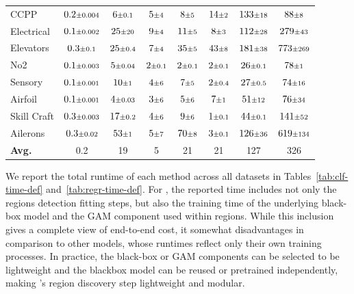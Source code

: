 \begin{table}[t]
\begin{tabular}{lccccccc}
CCPP & $0.2 \text{\scriptsize$\pm$0.004}$ & $6 \text{\scriptsize$\pm$0.1}$ & $5 \text{\scriptsize$\pm$4}$ & $8 \text{\scriptsize$\pm$5}$ & $14 \text{\scriptsize$\pm$2}$ & $133 \text{\scriptsize$\pm$18}$ & $88 \text{\scriptsize$\pm$8}$ \\
Electrical & $0.1 \text{\scriptsize$\pm$0.002}$ & $25 \text{\scriptsize$\pm$20}$ & $9 \text{\scriptsize$\pm$4}$ & $11 \text{\scriptsize$\pm$5}$ & $8 \text{\scriptsize$\pm$3}$ & $112 \text{\scriptsize$\pm$28}$ & $279 \text{\scriptsize$\pm$43}$ \\
Elevators & $0.3 \text{\scriptsize$\pm$0.1}$ & $25 \text{\scriptsize$\pm$0.4}$ & $7 \text{\scriptsize$\pm$4}$ & $35 \text{\scriptsize$\pm$5}$ & $43 \text{\scriptsize$\pm$8}$ & $181 \text{\scriptsize$\pm$38}$ & $773 \text{\scriptsize$\pm$269}$ \\
No2 & $0.1 \text{\scriptsize$\pm$0.003}$ & $5 \text{\scriptsize$\pm$0.04}$ & $2 \text{\scriptsize$\pm$0.1}$ & $2 \text{\scriptsize$\pm$0.1}$ & $2 \text{\scriptsize$\pm$0.1}$ & $26 \text{\scriptsize$\pm$0.1}$ & $78 \text{\scriptsize$\pm$1}$ \\
Sensory & $0.1 \text{\scriptsize$\pm$0.001}$ & $10 \text{\scriptsize$\pm$1}$ & $4 \text{\scriptsize$\pm$6}$ & $7 \text{\scriptsize$\pm$5}$ & $2 \text{\scriptsize$\pm$0.4}$ & $27 \text{\scriptsize$\pm$0.5}$ & $74 \text{\scriptsize$\pm$16}$ \\
Airfoil & $0.1 \text{\scriptsize$\pm$0.001}$ & $4 \text{\scriptsize$\pm$0.03}$ & $3 \text{\scriptsize$\pm$6}$ & $5 \text{\scriptsize$\pm$6}$ & $7 \text{\scriptsize$\pm$1}$ & $51 \text{\scriptsize$\pm$12}$ & $76 \text{\scriptsize$\pm$34}$ \\
Skill Craft & $0.3 \text{\scriptsize$\pm$0.003}$ & $17 \text{\scriptsize$\pm$0.2}$ & $4 \text{\scriptsize$\pm$6}$ & $9 \text{\scriptsize$\pm$6}$ & $1 \text{\scriptsize$\pm$0.1}$ & $44 \text{\scriptsize$\pm$0.1}$ & $141 \text{\scriptsize$\pm$52}$ \\
Ailerons & $0.3 \text{\scriptsize$\pm$0.02}$ & $53 \text{\scriptsize$\pm$1}$ & $5 \text{\scriptsize$\pm$7}$ & $70 \text{\scriptsize$\pm$8}$ & $3 \text{\scriptsize$\pm$0.1}$ & $126 \text{\scriptsize$\pm$36}$ & $619 \text{\scriptsize$\pm$134}$ \\
\midrule
\textbf{Avg.} & 0.2 & 19 & 5 & 21 & 21 & 127 & 326 \\
\bottomrule
\end{tabular}
\end{table}

We report the total runtime of each method across all datasets in Tables~\ref{tab:clf-time-def} and~\ref{tab:regr-time-def}. For \method{}, the reported time includes not only the regions detection fitting steps, but also the training time of the underlying black-box model and the GAM component used within regions. While this inclusion gives a complete view of end-to-end cost, it somewhat disadvantages \method{} in comparison to other models, whose runtimes reflect only their own training processes. In practice, the black-box or GAM components can be selected to be lightweight and the blackbox model can be reused or pretrained independently, making \method{}'s region discovery step lightweight and modular.

